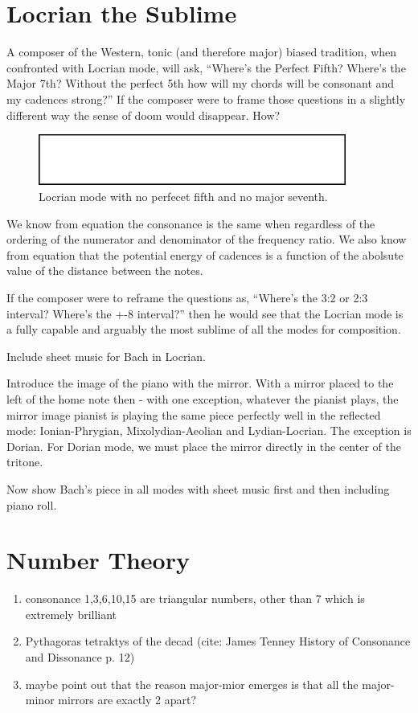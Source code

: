\documentclass[sn-mathphys]{sn-jnl}%
\begin{document}
\section{Locrian the Sublime}\label{locrianSec}
A composer of the Western, tonic (and therefore major) biased tradition, when confronted with Locrian mode, will ask, ``Where's the Perfect Fifth? Where's the Major 7th? Without the perfect 5th how will my chords will be consonant and my cadences strong?'' If the composer were to frame those questions in a slightly different way the sense of doom would disappear. How?

\begin{figure}[h]%
\centering
\includegraphics[width=0.9\textwidth]{fig.eps}
\caption{Locrian mode with no perfecet fifth and no major seventh.}\label{locrianScaleMusic}
\end{figure}

We know from equation the consonance is the same when regardless of the ordering of the numerator and denominator of the frequency ratio. We also know from equation that the potential energy of cadences is a function of the abolsute value of the distance between the notes.

If the composer were to reframe the questions as, ``Where's the 3:2 or 2:3 interval? Where's the +-8 interval?'' then he would see that the Locrian mode is a fully capable and arguably the most sublime of all the modes for composition.

Include sheet music for Bach in Locrian.

Introduce the image of the piano with the mirror. With a mirror placed to the left of the home note then - with one exception, whatever the pianist plays, the mirror image pianist is playing the same piece perfectly well in the reflected mode: Ionian-Phrygian, Mixolydian-Aeolian and Lydian-Locrian. The exception is Dorian. For Dorian mode, we must place the mirror directly in the center of the tritone.

Now show Bach's piece in all modes with sheet music first and then including piano roll.

\section{Number Theory}\label{sec12}
\begin{enumerate}
\item consonance 1,3,6,10,15 are triangular numbers, other than 7 which is extremely brilliant
\item Pythagoras tetraktys of the decad (cite: James Tenney History of Consonance and Dissonance p. 12)
\item maybe point out that the reason major-mior emerges is that all the major-minor mirrors are exactly 2 apart? 
\end{enumerate}
\end{document}
